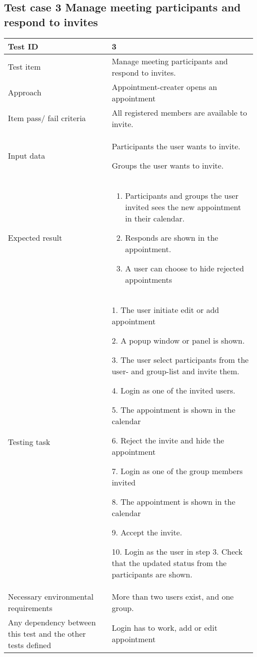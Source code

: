 \documentclass[a4paper, 10pt]{article}
\begin{document}
\subsection{Test case 3 Manage meeting participants and respond to invites}

\begin{tabularx}{\textwidth}{ |X|X| }
\hline
\rowcolor{Gray}
Test ID & 3 \\ \hline
Test item & Manage meeting participants and respond to invites. \\ \hline
Approach & Appointment-creater opens an appointment \\ \hline
Item pass/ fail criteria & All registered members are available to invite. \\ \hline
Input data & 
\begin{inputData}
	\item Participants the user wants to invite. 
	\item Groups the user wants to invite. 
\end{inputData}\\ \hline
Expected result & 
\begin{enumerate}
	\item Participants and groups the user invited sees the new appointment in their calendar.
	\item Responds are shown in the appointment.
	\item A user can choose to hide rejected appointments
\end{enumerate} \\ \hline
Testing task &
\begin{task steps}
	\item 1. The user initiate edit or add appointment
	\item 2. A popup window or panel is shown. 
	\item 3. The user select participants from the user- and group-list and invite them.
	\item 4. Login as one of the invited users. 
	\item 5. The appointment is shown in the calendar
	\item 6. Reject the invite and hide the appointment
	\item 7. Login as one of the group members invited
	\item 8. The appointment is shown in the calendar
	\item 9. Accept the invite.
	\item 10. Login as the user in step 3. Check that the updated status from the participants are shown. 
\end{task steps}	\\ \hline
Necessary environmental requirements & More than two users exist, and one group.   \\ \hline
Any dependency between this test and the other tests defined & Login has to work, add or edit appointment  \\ \hline

\end{tabularx}
\end{document}
